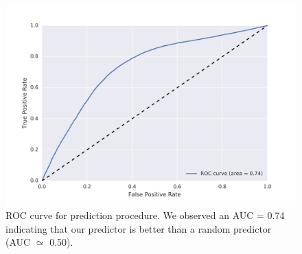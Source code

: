 \begin{figure}[H]
\begin{center}
\includegraphics[width=\columnwidth]{figures/ROC_BETA/ROC_Beta_based_approach_201504.png}
\caption{ROC curve for prediction procedure. We observed an AUC = 0.74 indicating that our predictor is better than a random predictor (AUC $\simeq$ 0.50).}
\label{ROC_multiclass}
\end{center}
\end{figure}

%
%
%
